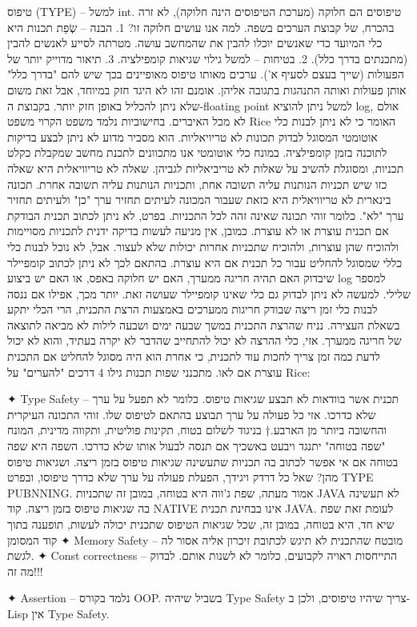      טיפוס (TYPE) – למשל int. טיפוסים הם חלוקה (מערכת הטיפוסים הינה חלוקה), לא זרה
      בהכרח, של קבוצת הערכים בשפה. למה אנו עושים חלוקה זו?
      1. הבנה – שְׂפַת תכנות היא כלי המיועד כדי שאנשים יוכלו להבין את שהמחשב עושה.
      מטרתה לסייע לאנשים להבין (מתכנתים בדרך כלל).
      2. בטיחות – למשל גילוי שגיאות קומפילציה.
      3. תיאור מדוייק יותר של הפעולות (שייך בעצם לסעיף א').
      ערכים מאותו טיפוס מאופיינים בכך שיש להם "בדרך כלל" אותן פעולות ואותה התנהגות
      בתגובה אליהן. אומנם זהו לא היגד חזק במיוחד, אבל זאת משום שלא ניתן להכליל באופן
      חזק יותר. בקבוצת ה-floating point למשל ניתן להוציא log, אולם לא מכל האיברים.
      בחישוביות נלמד משפט הקרוי משפט Rice האומר כי לא ניתן לבנות כלי אוטומטי המסוגל
      לבדוק תכונות לא טריויאליות. הוא מסביר מדוע לא ניתן לבצע בדיקות לתוכנה בזמן
      קומפילציה.
      במונח כלי אוטומטי אנו מתכוונים לתכנת מחשב שמקבלת כקלט תכניות, ומסוגלת להשיב על
      שאלות לא טריביאליות לגביהן. שאלה לא טריוויאלית היא שאלה כזו שיש תכניות הנותנות
      עליה תשובה אחת, ותכניות הנותנות עליה תשובה אחרת. תכונה בינארית לא טריוויאלית
      היא כזאת שעבור המכונה לעיתים תחזיר ערך "כן" ולעיתים תחזיר ערך "לא". כלומר זוהי
      תכונה שאינה זהה לכל התכניות. בפרט, לא ניתן לכתוב תכנית הבודקת אם תכנית עוצרת
      או לא עוצרת. כמובן, אין מניעה לעשות בדיקה ידנית לתכניות מסויימות ולהוכיח שהן
      עוצרות, ולהוכיח שתכניות אחרות יכולות שלא לעצור. אבל, לא נוכל לבנות כלי כללי
      שמסוגל להחליט עבור כל תכנית אם היא עוצרת. בהתאם לכך לא ניתן לכתוב קומפיילר
      שיבדוק האם תהיה חריגה ממערך, האם יש חלוקה באפס, או האם יש ביצוע log למספר
      שלילי. למעשה לא ניתן לבדוק גם כלי שאינו קומפיילר שעושה זאת. יותר מכך, אפילו אם
      ננסה לבנות כלי זמן ריצה שבודק חריגות ממערכים באמצעות הרצת התכנית, הרי הכלי יתקע
      בשאלת העצירה. נניח שהרצת התכנית במשך שבעה ימים ושבעה לילות לא מביאה לתוצאה של
      חריגה ממערך. אזי, כלי ההרצה לא יכול להתחייב שהדבר לא יקרה בעתיד, והוא לא יכול
      לדעת כמה זמן צריך לחכות עוד לתכנית, כי אחרת הוא היה מסוגל להחליט אם התכנית
      עוצרת אם לאו.
      מתכנני שפות תכנות גילו 4 דרכים "להערים" על Rice:
      \begin{enumerate}
          ✦ Type Safety – תכנית אשר בוודאות לא תבצע שגיאות טיפוס. כלומר לא תפעל על
      ערך שלא כדרכו. אזי כל פעולה על ערך תבוצע בהתאם לטיפוס שלו. זוהי התכונה
      העיקרית והחשובה ביותר מן הארבע.†{ בניגוד לשלום בטוח, תקינות פוליטית,
      ותקווה מדינית, המונח "שפה בטוחה" יתנגד ויבעט באשכיך אם תנסה לבעול אותו
    שלא כדרכו. השפה היא שפה בטוחה אם אי אפשר לכתוב בה תכניות שתעשינה שגיאות
  טיפוס בזמן ריצה. ושגיאות טיפוס מהן? שאל כל דרדק ויגידך, הפעלת פעולה על ערך
שלא כדרך טיפוסו, ובפרט TYPE PUBNNING. אמור מעתה, שפת ג'ווה היא בטוחה, במובן זה
שתכניות JAVA לא תעשינה בה שגיאות טיפוס בזמן ריצה. קוד NATIVE אינו בבחינת תכנית
JAVA. לעומת זאת שפת שיא חד, היא בטוחה, במובן זה, שכל שגיאות הטיפוס שתכנית יכולה
לעשות, תופענה בתוך קוד המסומן}
✦ Memory Safety – מובטח שהתכנית לא תיגש לכתובת
זיכרון אליה אסור לה לגשת.
      ✦ Const correctness – התייחסות ראויה לקבועים, כלומר לא לשנות אותם. לבדוק מה זה!!!

      ✦ Assertion – נלמד בקורס OOP.
      בשביל שיהיה Type Safety צריך שיהיו טיפוסים, ולכן ב-Lisp אין Type Safety.
  \end{enumerate}

